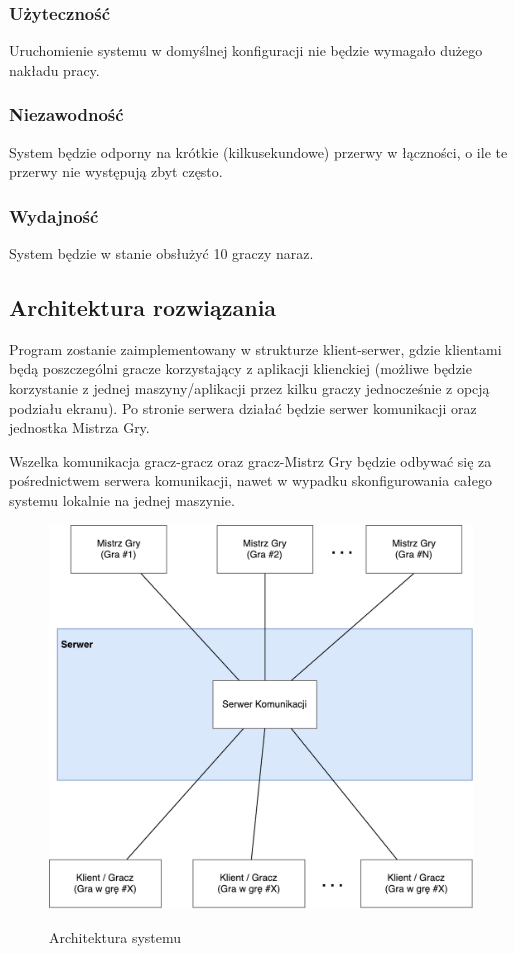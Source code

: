 \documentclass[11pt]{article}
\let\Oldsubsection\subsection
\renewcommand{\subsection}{\FloatBarrier\Oldsubsection}
\let\Oldsubsubsection\subsubsection
\renewcommand{\subsubsection}{\FloatBarrier\Oldsubsubsection}
\begin{document}
\subsubsection{Użyteczność}

Uruchomienie systemu w domyślnej konfiguracji nie będzie wymagało dużego nakładu pracy.

\subsubsection{Niezawodność}

System będzie odporny na krótkie (kilkusekundowe) przerwy w łączności, o ile te przerwy nie występują zbyt często.

\subsubsection{Wydajność}

System będzie w stanie obsłużyć 10 graczy naraz.

\subsection{Architektura rozwiązania}
\par
Program zostanie zaimplementowany w strukturze klient-serwer, gdzie klientami będą poszczególni gracze korzystający z aplikacji klienckiej (możliwe będzie korzystanie z jednej maszyny/aplikacji przez kilku graczy jednocześnie z opcją podziału ekranu). Po stronie serwera działać będzie serwer komunikacji oraz jednostka Mistrza Gry.
\par
Wszelka komunikacja gracz-gracz oraz gracz-Mistrz Gry będzie odbywać się za pośrednictwem serwera komunikacji, nawet w wypadku skonfigurowania całego systemu lokalnie na jednej maszynie.

\begin{figure}[!h]
\caption{Architektura systemu}
\resizebox{\textwidth}{!}
{
\includegraphics{../res/architecture}
}
\end{figure}
\FloatBarrier
\end{document}
